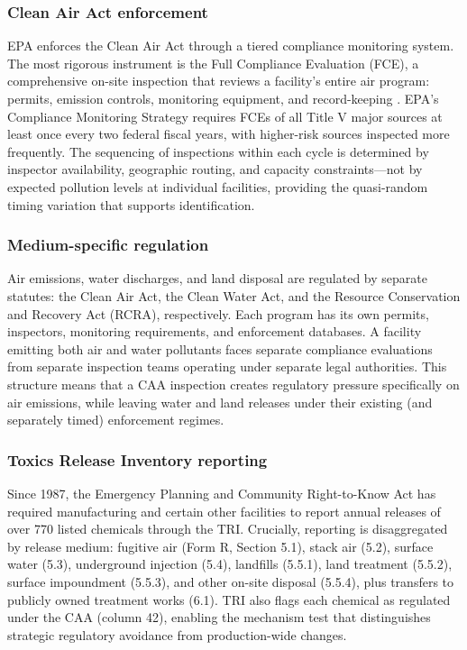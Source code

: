 \documentclass[12pt]{article}
\begin{document}
\subsubsection*{Clean Air Act enforcement} EPA enforces the Clean Air Act through a tiered compliance monitoring system. The most rigorous instrument is the Full Compliance Evaluation (FCE), a comprehensive on-site inspection that reviews a facility's entire air program: permits, emission controls, monitoring equipment, and record-keeping \citep{epa2014cms}. EPA's Compliance Monitoring Strategy requires FCEs of all Title V major sources at least once every two federal fiscal years, with higher-risk sources inspected more frequently. The sequencing of inspections within each cycle is determined by inspector availability, geographic routing, and capacity constraints---not by expected pollution levels at individual facilities, providing the quasi-random timing variation that supports identification.

\subsubsection*{Medium-specific regulation} Air emissions, water discharges, and land disposal are regulated by separate statutes: the Clean Air Act, the Clean Water Act, and the Resource Conservation and Recovery Act (RCRA), respectively. Each program has its own permits, inspectors, monitoring requirements, and enforcement databases. A facility emitting both air and water pollutants faces separate compliance evaluations from separate inspection teams operating under separate legal authorities. This structure means that a CAA inspection creates regulatory pressure specifically on air emissions, while leaving water and land releases under their existing (and separately timed) enforcement regimes.

\subsubsection*{Toxics Release Inventory reporting} Since 1987, the Emergency Planning and Community Right-to-Know Act has required manufacturing and certain other facilities to report annual releases of over 770 listed chemicals through the TRI. Crucially, reporting is disaggregated by release medium: fugitive air (Form R, Section 5.1), stack air (5.2), surface water (5.3), underground injection (5.4), landfills (5.5.1), land treatment (5.5.2), surface impoundment (5.5.3), and other on-site disposal (5.5.4), plus transfers to publicly owned treatment works (6.1). TRI also flags each chemical as regulated under the CAA (column 42), enabling the mechanism test that distinguishes strategic regulatory avoidance from production-wide changes.
\end{document}
